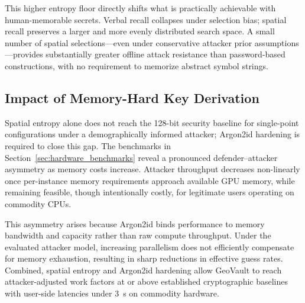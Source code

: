 \documentclass[mathematics,article,accept,pdftex,moreauthors]{Definitions/mdpi}
\begin{document}
{This higher entropy floor directly shifts what is practically achievable with human-memorable secrets. Verbal recall collapses under selection bias; spatial recall preserves a larger and more evenly distributed search space. A small number of spatial selections---even under conservative attacker prior assumptions---provides substantially greater offline attack resistance than password-based constructions, with no requirement to memorize abstract symbol strings.}

\subsection{Impact of Memory-Hard Key Derivation}

{Spatial entropy alone does not reach the 128-bit security baseline for single-point configurations under a demographically informed attacker; Argon2id hardening is required to close this gap. The benchmarks in Section~\ref{sec:hardware_benchmarks} reveal a pronounced defender--attacker asymmetry as memory costs increase.} Attacker throughput decreases non-linearly once per-instance memory requirements approach available GPU memory, while remaining feasible, though intentionally costly, for legitimate users operating on commodity CPUs.

This asymmetry arises because Argon2id binds performance to memory bandwidth and capacity rather than raw compute throughput. Under the evaluated attacker model, increasing parallelism does not efficiently compensate for memory exhaustion, resulting in sharp reductions in effective guess rates. %
{Combined, spatial entropy and Argon2id hardening allow GeoVault to reach attacker-adjusted work factors at or above established cryptographic baselines with user-side latencies under 3~s on commodity hardware.}
\end{document}
